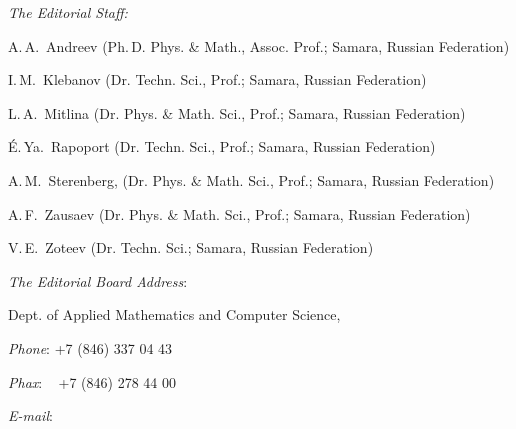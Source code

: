 \bigskip 



 



\noindent

\textit{The Editorial Staff:}\/

\par \noindent \smallskip

A.\,A.~Andreev (Ph.\,D. Phys. \& Math., Assoc. Prof.; Samara, Russian Federation) \par \noindent 

I.\,M.~Klebanov (Dr. Techn. Sci., Prof.; Samara, Russian Federation) \par \noindent 

L.\,A.~Mitlina (Dr. Phys. \& Math. Sci., Prof.; Samara, Russian Federation) \par \noindent 

\'E.\,Ya.~Rapoport (Dr. Techn. Sci., Prof.; Samara, Russian Federation) \par \noindent 

A.\,M.~Sterenberg, (Dr. Phys. \& Math. Sci., Prof.; Samara, Russian Federation)  \par \noindent 

A.\,F.~Zausaev (Dr. Phys. \& Math. Sci., Prof.; Samara, Russian Federation) \par \noindent 

V.\,E.~Zoteev (Dr. Techn. Sci.; Samara, Russian Federation) \par

\bigskip  

 

%

\noindent

\textit{The Editorial Board Address}\/:

\par \noindent Dept. of Applied Mathematics and Computer Science,

\par \noindent \ensamgtu



\bigskip 



\par \noindent \textit{Phone}\/: +7 (846) 337 04 43

\par \noindent \textit{Phax}\/:~\,\, +7 (846) 278 44 00

\par \noindent \textit{E-mail}\/: 

